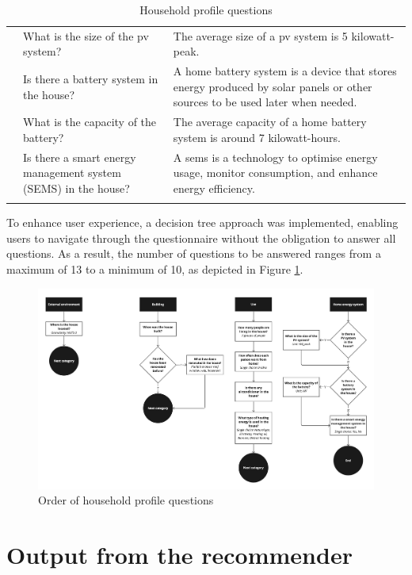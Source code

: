 \begin{center}
\begin{longtable}{ | p{} | p{} | p{} | }
          & What is the size of the \gls{pv} system? & The average size of a \gls{pv} system is 5 kilowatt-peak. \\
          & Is there a battery system in the house? & A home battery system is a device that stores energy produced by solar panels or other sources to be used later when needed. \\
          & What is the capacity of the battery? & The average capacity of a home battery system is around 7 kilowatt-hours. \\
          & Is there a smart energy management system (SEMS) in the house? & A \gls{sems} is a technology to optimise energy usage, monitor consumption, and enhance energy efficiency. \\
        \hline
    \caption{Household profile questions}
    \label{tab:questions}
    \end{longtable}
\end{center}

To enhance user experience, a decision tree approach was implemented, enabling users to navigate through the questionnaire without the obligation to answer all questions.
As a result, the number of questions to be answered ranges from a maximum of 13 to a minimum of 10, as depicted in Figure \ref{fig:trees}. 
\begin{figure}[h!]
  \centering
  \includegraphics[width=\textwidth]{Images/trees.jpg}
  \caption{Order of household profile questions}
  \label{fig:trees}
\end{figure}


\section{Output from the recommender}

